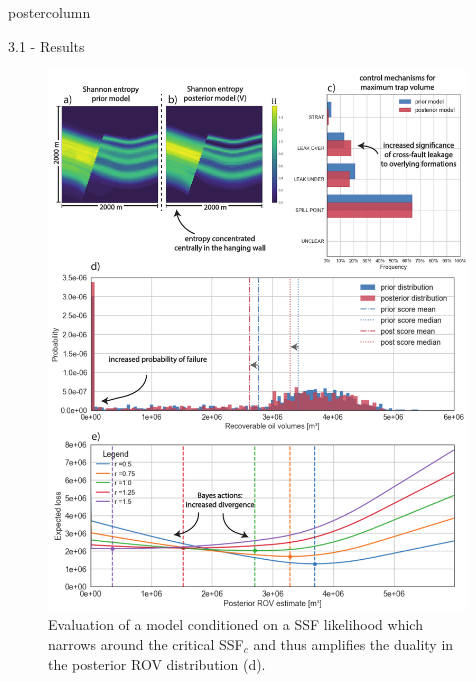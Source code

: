 \documentclass{beamer}
\begin{document}
\begin{frame}
\begin{columns}
\begin{column}{.499\textwidth}
\begin{beamercolorbox}[center]{postercolumn}
\begin{minipage}{.98\textwidth}
{\begin{myblock}{3.1 - Results}
\begin{figure}
\begin{minipage}{0.98\textwidth}
\begin{minipage}[t]{0.49\textwidth}
				\label{fig:ML4}
			\end{minipage}
			\begin{minipage}[t]{0.49\textwidth}
				\centering\includegraphics[width=0.99\textwidth]{figures/ML5.pdf}
				\caption{Evaluation of a model conditioned on a SSF likelihood which narrows around the critical SSF$_c$ and thus amplifies the duality in the posterior ROV distribution (d).}
				\label{fig:ML5}
			\end{minipage}	
		\end{minipage}
	\end{figure}


\end{myblock}}
\end{minipage}
\end{beamercolorbox}
\end{column}
\end{columns}
\end{frame}
\end{document}
